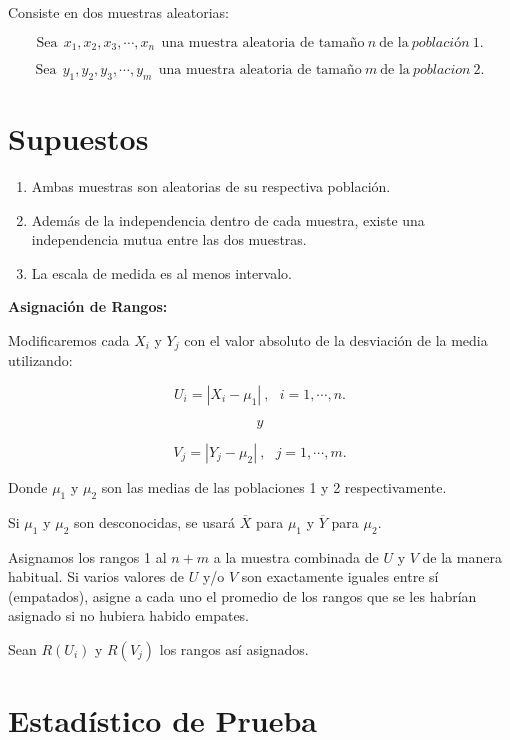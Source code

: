 \documentclass[
  a4paper,
  oneside,
  openany]{book}
\begin{document}
Consiste en dos muestras aleatorias:

\[\mbox{Sea} \ \ x_{1},x_{2},x_{3},\cdots,x_{n} \ \ \mbox{una muestra aleatoria de tamaño} \  n  \ \mbox{de la} \ población \ 1.\]

\[\mbox{Sea} \ \ y_{1},y_{2},y_{3},\cdots,y_{m} \ \ \mbox{una muestra aleatoria de tamaño} \ m \  \mbox{de la} \ poblacion\ 2.\]

\hypertarget{supuestos-8}{%
\section{Supuestos}\label{supuestos-8}}

\begin{enumerate}
\def\labelenumi{\arabic{enumi})}
\item
  Ambas muestras son aleatorias de su respectiva población.
\item
  Además de la independencia dentro de cada muestra, existe una independencia mutua entre las dos muestras.
\item
  La escala de medida es al menos intervalo.
\end{enumerate}

\textbf{Asignación de Rangos:}

Modificaremos cada \(X_{i}\) y \(Y_{j}\) con el valor absoluto de la desviación de la media utilizando:

\[U_{i} = |X_{i}-\mu_{1}| \ , \ \ \ i=1,\cdots,n.\]

\[y\]

\[V_{j} = |Y_{j}-\mu_{2}|\  ,\ \ \ j=1,\cdots,m.\]

Donde \(\mu_{1}\) y \(\mu_{2}\) son las medias de las poblaciones 1 y 2 respectivamente.

Si \(\mu_{1}\) y \(\mu_{2}\) son desconocidas, se usará \(\overline{X}\) para \(\mu_{1}\) y \(\overline{Y}\) para \(\mu_{2}\).

Asignamos los rangos 1 al \(n + m\) a la muestra combinada de \(U\) y \(V\) de la manera habitual.
Si varios valores de \(U\) y/o \(V\) son exactamente iguales entre sí (empatados), asigne a cada uno el promedio de los rangos que se les habrían asignado si no hubiera habido empates.

Sean \(R(U_{i})\) y \(R(V_{j})\) los rangos así asignados.

\hypertarget{estaduxedstico-de-prueba-7}{%
\section{Estadístico de Prueba}\label{estaduxedstico-de-prueba-7}}
\end{document}
